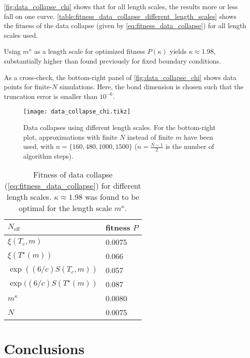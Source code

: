 \autoref{fig:data_collapse_chi} shows that for all length scales, the results more or less fall on one curve.
\autoref{table:fitness_data_collapse_different_length_scales} shows the fitness of the data collapse
\cite{bhattacharjee2001measure} (given by \autoref{eq:fitness_data_collapse}) for all length scales used.


Using $m^{\kappa}$ as a length scale for optimized fitness $P(\kappa)$ yields $\kappa \approx 1.98$,
substantially higher than found previously for fixed boundary conditions.

As a cross-check, the bottom-right panel of \autoref{fig:data_collapse_chi} shows data points for finite-$N$
simulations. Here, the bond dimension is chosen such that the truncation error is smaller than $10^{-6}$.

\begin{figure}
  \texttt{[image: data\_collapse\_chi.tikz]}
  \caption{Data collapses using different length scales.
  For the bottom-right plot, approximations with finite $N$ instead of finite $m$ have been used,
  with $n = \{160, 480, 1000, 1500 \}$ ($n = \frac{N - 1}{2}$ is the number of algorithm
  steps).}\label{fig:data_collapse_chi}
\end{figure}

\begin{table}[]
\centering
\begin{tabular}{@{}ll@{}} \toprule
$N_{\text{eff}}$                  & fitness $P$ \\ \midrule
$\xi(T_c, m)$                     & 0.0075      \\
$\xi(T^{\star}(m))$               & 0.066       \\
$\exp((6/c)S(T_c, m))$            & 0.057       \\
$\exp((6/c)S(T^{\star}(m))$       & 0.087       \\
$m^{\kappa}$                      & 0.0080      \\
$N$                               & 0.0075      \\ \bottomrule
\end{tabular}
  \caption{Fitness of data collapse (\autoref{eq:fitness_data_collapse}) for different length scales.
  $\kappa \approx 1.98$ was found to be optimal for the length scale $m^{\kappa}$.}
  \label{table:fitness_data_collapse_different_length_scales}
\end{table}


\section{Conclusions}

